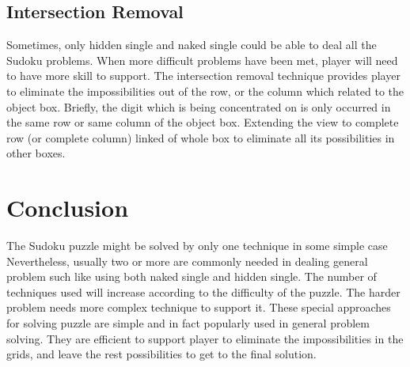 \documentclass[11pt]{report}
\begin{document}
\section{Intersection Removal}
\label{sec:Intersection Removal}
Sometimes, only hidden single and naked single could be able to deal all the Sudoku problems. When more difficult problems have been met, player will need to have more skill to support.
The intersection removal technique provides player to eliminate the impossibilities out of the row, or the column which related to the object box.
Briefly, the digit which is being concentrated on is only occurred in the same row or same column of the object box. Extending the view to complete row (or complete column) linked of whole box to eliminate all its possibilities in other boxes.




\chapter{Conclusion}
\label{sec:Conclusion}
The Sudoku puzzle might be solved by only one technique in some simple case Nevertheless, usually two or more are commonly needed in dealing general problem such like using both naked single and hidden single. The number of techniques used will increase according to the difficulty of the puzzle. The harder problem needs more complex technique to support it.
These special approaches for solving puzzle are simple and in fact popularly used in general problem solving. They are efficient to support player to eliminate the impossibilities in the grids, and leave the rest possibilities to get to the final solution.





\end{document}

